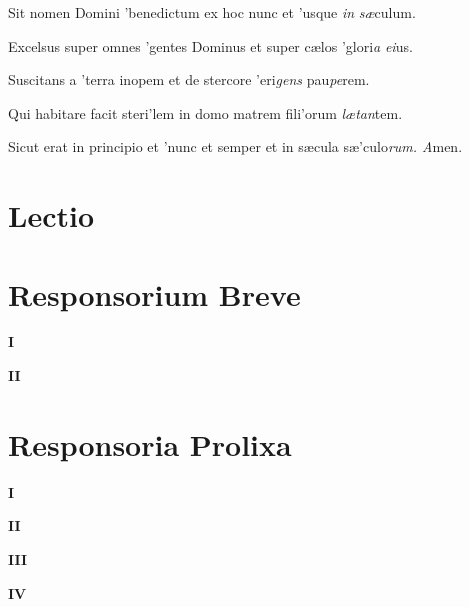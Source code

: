 \par
{}
\par
\vskip9bp
\begin{multicols}{2}\setlength{\columnseprule}{0.2px}
Sit nomen Domini 'benedictum \grestar{} ex hoc nunc et 'usque \textit{in} \textit{sæ}culum.\par
{}\par
Excelsus super omnes 'gentes Dominus \grestar{} et super cælos 'glori\textit{a} \textit{ei}us.\par
{}\par
Suscitans a 'terra inopem \grestar{} et de stercore 'eri\textit{gens} pau\textit{pe}rem.\par
{}\par
Qui habitare facit steri'lem in domo \grestar{} matrem fili'orum \textit{lætan}tem.\par
{}\par
Sicut erat in principio et 'nunc et semper \grestar{} et in sæcula sæ'culo\textit{rum. A}men.\par
\end{multicols}
\section*{Lectio}
\newpage
\section*{Responsorium Breve}
\textbf{I}\par
{}
\par
\textbf{II}\par
{}
\par
\section*{Responsoria Prolixa}
\textbf{I}\par
{}
\par
\textbf{II}\par
\ueberinitiale{\Rbar}{}
\par\newpage
\textbf{III}\par
{}
\par
\textbf{IV}\par
{}
\newpage
